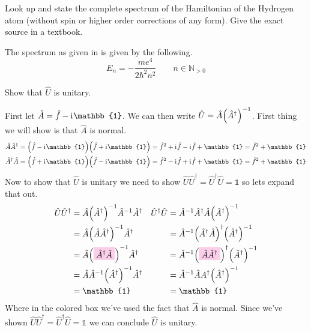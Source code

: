 \documentclass[boxes,pages]{homework}
\makeatletter
\newcommand{\highlight}[2][LightLavender]{\mathchoice%
  {\colorbox{#1}{$\displaystyle#2$}}%
  {\colorbox{#1}{$\textstyle#2$}}%
  {\colorbox{#1}{$\scriptstyle#2$}}%
  {\colorbox{#1}{$\scriptscriptstyle#2$}}}%
\newcommand{\iu}{\mathrm{i}\mkern1mu}
\newcommand{\inv}[1]{{{#1}^{-1}}}
\newcommand{\herm}[1]{{{#1}^\dagger}}
\numberwithin{@problem}{section}
\makeatother
\begin{document}
\begin{problem}
Look up and state the complete spectrum of the Hamiltonian of the Hydrogen atom (without spin or higher order corrections of any form). Give the exact source in a textbook.
\end{problem}

\begin{solution}
	The spectrum as given in \cite[355]{shankar} is given by the following.
	\begin{equation*}
		E_n = -\frac{me^4}{2\hbar^2n^2}\qquad n\in\mathbb{N}_{>0}
	\end{equation*}
	\printbibliography{}
\end{solution}

\begin{problem}
Show that $\hat{U}$ is unitary.
\end{problem}

\begin{solution}
	First let $\hat{A} = \hat{f} - \iu\mathbb{1}$. We can then write $\hat{U} = \hat{A}\inv{\qty(\herm{\hat{A}})}$. First thing we will show is that $\hat{A}$ is normal.
	\begin{align*}
		\hat{A}\herm{\hat{A}} & = \qty(\hat{f} -\iu\mathbb{1})\qty(\hat{f} + \iu\mathbb{1}) = \hat{f}^2 + \iu\hat{f} - \iu\hat{f} + \mathbb{1} = \hat{f}^2 + \mathbb{1} \\
		\herm{\hat{A}}\hat{A} & = \qty(\hat{f} +\iu\mathbb{1})\qty(\hat{f} - \iu\mathbb{1}) = \hat{f}^2 - \iu\hat{f} + \iu\hat{f} + \mathbb{1} = \hat{f}^2 + \mathbb{1}
	\end{align*}
	Now to show that $\hat{U}$ is unitary we need to show $\hat{U}\herm{\hat{U}} = \herm{\hat{U}}\hat{U} = \mathbb{1}$ so lets expand that out.
	\begin{align*}
		\hat{U}\herm{\hat{U}} & = \hat{A}\inv{\qty(\herm{\hat{A}})}\inv{\hat{A}}\herm{\hat{A}}       & \herm{\hat{U}}\hat{U} & = \inv{\hat{A}}\herm{\hat{A}}\hat{A}\inv{\qty(\herm{\hat{A}})}                          \\
		                      & = \hat{A}\inv{\qty(\hat{A}\herm{\hat{A}})}\herm{\hat{A}}             &                       & = \inv{\hat{A}}\herm{\qty(\herm{\hat{A}}\hat{A})}\inv{\qty(\herm{\hat{A}})}             \\
		                      & = \hat{A}\inv{\qty(\highlight{\herm{\hat{A}}\hat{A}})}\herm{\hat{A}} &                       & = \inv{\hat{A}}\herm{\qty(\highlight{\hat{A}\herm{\hat{A}}})}\inv{\qty(\herm{\hat{A}})} \\
		                      & = \hat{A}\inv{\hat{A}}\inv{\qty(\herm{\hat{A}})}\herm{\hat{A}}       &                       & = \inv{\hat{A}}\hat{A}\herm{A}\inv{\qty(\herm{\hat{A}})}                                \\
		                      & = \mathbb{1}                                                         &                       & = \mathbb{1}
	\end{align*}
	Where in the colored box we've used the fact that $\hat{A}$ is normal. Since we've shown $\hat{U}\herm{\hat{U}} = \herm{\hat{U}}\hat{U} = \mathbb{1}$ we can conclude $\hat{U}$ is unitary.
\end{solution}
\end{document}
